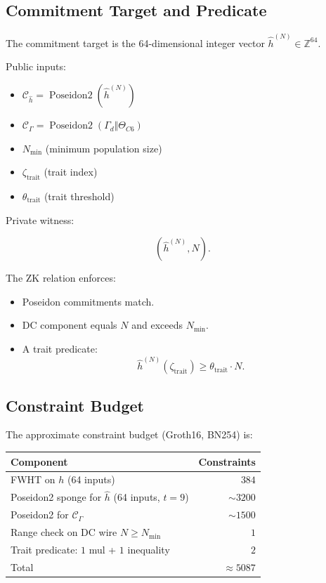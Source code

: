 \documentclass[11pt]{article}
\begin{document}
\subsection{Commitment Target and Predicate}

The commitment target is the 64-dimensional integer vector $\hat{h}^{(N)} \in \mathbb{Z}^{64}$.

Public inputs:

\begin{itemize}[nosep]
  \item $\mathcal{C}_{\hat{h}} = \operatorname{Poseidon2}(\hat{h}^{(N)})$
  \item $\mathcal{C}_\Gamma = \operatorname{Poseidon2}(\Gamma_d \Vert \Theta_{C6})$
  \item $N_{\min}$ (minimum population size)
  \item $\zeta_{\text{trait}}$ (trait index)
  \item $\theta_{\text{trait}}$ (trait threshold)
\end{itemize}

Private witness:

\[
(\hat{h}^{(N)}, N).
\]

The ZK relation enforces:

\begin{itemize}[nosep]
  \item Poseidon commitments match.
  \item DC component equals $N$ and exceeds $N_{\min}$.
  \item A trait predicate:
    \[
    \hat{h}^{(N)}(\zeta_{\text{trait}}) \ge \theta_{\text{trait}} \cdot N.
    \]
\end{itemize}

\subsection{Constraint Budget}

The approximate constraint budget (Groth16, BN254) is:

\begin{center}
\begin{tabular}{l r}
\toprule
Component & Constraints \\
\midrule
FWHT on $h$ (64 inputs) & $384$ \\
Poseidon2 sponge for $\hat{h}$ (64 inputs, $t=9$) & $\sim 3200$ \\
Poseidon2 for $\mathcal{C}_\Gamma$ & $\sim 1500$ \\
Range check on DC wire $N \ge N_{\min}$ & $1$ \\
Trait predicate: $1$ mul + $1$ inequality & $2$ \\
\midrule
Total & $\approx 5087$ \\
\bottomrule
\end{tabular}
\end{center}
\end{document}
